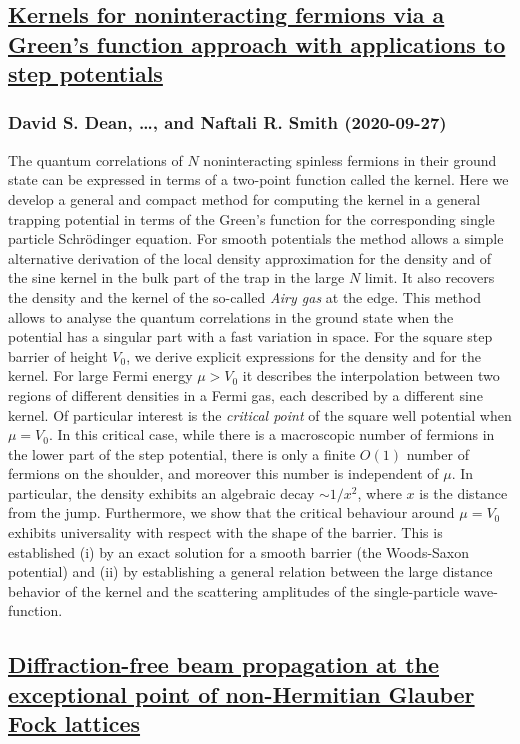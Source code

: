 \subsection*{\href{http://arxiv.org/abs/2009.12882v1}{Kernels for noninteracting fermions via a Green's function approach with  applications to step potentials}}
\subsubsection*{David S. Dean, \dots, and Naftali R. Smith (2020-09-27)}
The quantum correlations of $N$ noninteracting spinless fermions in their
ground state can be expressed in terms of a two-point function called the
kernel. Here we develop a general and compact method for computing the kernel
in a general trapping potential in terms of the Green's function for the
corresponding single particle Schr\"odinger equation. For smooth potentials the
method allows a simple alternative derivation of the local density
approximation for the density and of the sine kernel in the bulk part of the
trap in the large $N$ limit. It also recovers the density and the kernel of the
so-called {\em Airy gas} at the edge. This method allows to analyse the quantum
correlations in the ground state when the potential has a singular part with a
fast variation in space. For the square step barrier of height $V_0$, we derive
explicit expressions for the density and for the kernel. For large Fermi energy
$\mu>V_0$ it describes the interpolation between two regions of different
densities in a Fermi gas, each described by a different sine kernel. Of
particular interest is the {\em critical point} of the square well potential
when $\mu=V_0$. In this critical case, while there is a macroscopic number of
fermions in the lower part of the step potential, there is only a finite $O(1)$
number of fermions on the shoulder, and moreover this number is independent of
$\mu$. In particular, the density exhibits an algebraic decay $\sim 1/x^2$,
where $x$ is the distance from the jump. Furthermore, we show that the critical
behaviour around $\mu = V_0$ exhibits universality with respect with the shape
of the barrier. This is established (i) by an exact solution for a smooth
barrier (the Woods-Saxon potential) and (ii) by establishing a general relation
between the large distance behavior of the kernel and the scattering amplitudes
of the single-particle wave-function.

\subsection*{\href{http://arxiv.org/abs/2009.12880v1}{Diffraction-free beam propagation at the exceptional point of  non-Hermitian Glauber Fock lattices}}
